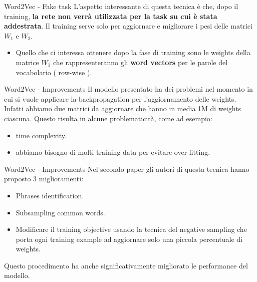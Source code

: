 \documentclass[british]{beamer}
\begin{document}
\begin{frame}{Word2Vec - Fake task}
	L'aspetto interessante di questa tecnica \`{e} che, dopo il training, \textbf{la rete non verr\`{a} utilizzata per la task su cui \`{e} stata addestrata}. Il training serve solo per aggiornare e migliorare i pesi delle matrici \(W_1\) e \(W_2\).
	\begin{itemize}
		\item Quello che ci interessa ottenere dopo la fase di training sono le weights della matrice \(W_1\) che rappresenteranno gli \textbf{word vectors} per le parole del vocabolario ( row-wise ).
	\end{itemize}
\end{frame}

\begin{frame}{Word2Vec - Improvements}
	Il modello presentato ha dei problemi nel momento in cui si vuole applicare la backpropagation per l'aggiornamento delle weights.
	Infatti abbiamo due matrici da aggiornare che hanno in media 1M di weights ciascuna.
	Questo risulta in alcune problematicit\`{a}, come ad esempio:
	\begin{itemize}
		\item time complexity.
		\item abbiamo bisogno di molti training data per evitare over-fitting.
	\end{itemize}
\end{frame}
\begin{frame}{Word2Vec - Improvements}
	Nel secondo paper gli autori di questa tecnica hanno proposto 3 miglioramenti:
	\begin{itemize}
		\item Phrases identification.
		\item Subsampling common words.
		\item Modificare il training objective usando la tecnica del negative sampling che porta ogni training example ad aggiornare solo una piccola percentuale di weights.
	\end{itemize}
	Questo procedimento ha anche significativamente migliorato le performance del modello.
\end{frame}
\end{document}
